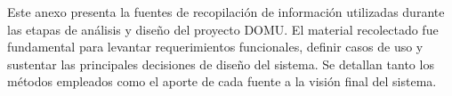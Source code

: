 
Este anexo presenta la fuentes de recopilación de información utilizadas durante las etapas de análisis y diseño del proyecto DOMU. El material recolectado fue fundamental para levantar requerimientos funcionales, definir casos de uso y sustentar las principales decisiones de diseño del sistema. Se detallan tanto los métodos empleados como el aporte de cada fuente a la visión final del sistema.





